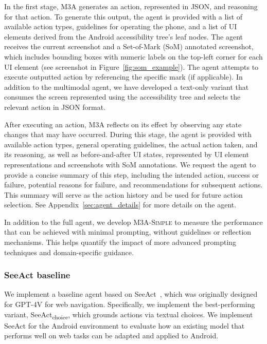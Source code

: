 \documentclass{article}
\newcommand{\agent}{\textsc{M3A}\xspace}
\newcommand{\agentsimple}{\textsc{M3A-Simple}\xspace}
\begin{document}
In the first stage, \agent generates an action, represented in JSON, and reasoning for that action. To generate this output, the agent is provided with a list of available action types, guidelines for operating the phone, and a list of UI elements derived from the Android accessibility tree's leaf nodes. The agent receives the current screenshot and a Set-of-Mark (SoM) \citep{yang2023set} annotated screenshot, which includes bounding boxes with numeric labels on the top-left corner for each UI element (see screenshot in Figure~\ref{fig:som_example}). The agent attempts to execute outputted action by referencing the specific mark (if applicable). In addition to the multimodal agent, we have developed a text-only variant that consumes the screen represented using the accessibility tree and selects the relevant action in JSON format.

After executing an action, \agent reflects on its effect by observing any state changes that may have occurred. During this stage, the agent is provided with available action types, general operating guidelines, the actual action taken, and its reasoning, as well as before-and-after UI states, represented by UI element representations and screenshots with SoM annotations. We request the agent to provide a concise summary of this step, including the intended action, success or failure, potential reasons for failure, and recommendations for subsequent actions. This summary will serve as the action history and be used for future action selection. See Appendix~\ref{sec:agent_details} for more details on the agent.

In addition to the full agent, we develop \agentsimple to measure the performance that can be achieved with minimal prompting, without guidelines or reflection mechanisms. This helps quantify the impact of more advanced prompting techniques and domain-specific guidance.

\subsubsection{SeeAct baseline}

We implement a baseline agent based on SeeAct~\citep{zheng2023seeact}, which was originally designed for GPT-4V for web navigation. Specifically, we implement the best-performing variant, SeeAct\textsubscript{choice}, which grounds actions via textual choices. We implement SeeAct for the Android environment to evaluate how an existing model that performs well on web tasks \citep{deng2023mind2web} can be adapted and applied to Android.
\end{document}
